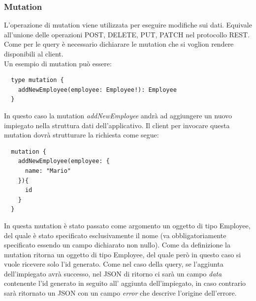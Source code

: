 \subsubsection*{Mutation}
L'operazione di mutation viene utilizzata per eseguire modifiche sui dati. Equivale all'unione delle operazioni POST, DELETE, PUT, PATCH nel protocollo REST. Come per le query è necessario dichiarare le mutation che si voglion rendere disponibili al client.\\
Un esempio di mutation può essere:
\begin{verbatim}
  type mutation {
    addNewEmployee(employee: Employee!): Employee
  }
\end{verbatim}
In questo caso la mutation \textit{addNewEmployee} andrà ad aggiungere un nuovo impiegato nella struttura dati dell'applicativo. Il client per invocare questa mutation dovrà strutturare la richiesta come segue:
\begin{verbatim}
  mutation {
    addNewEmployee(employee: {
      name: "Mario"
    }){
      id
    }
  }
\end{verbatim}
In questa mutation è stato passato come argomento un oggetto di tipo Employee, del quale è stato specificato esclusivamente il nome (va obbligatoriamente specificato essendo un campo dichiarato non nullo). Come da definizione la mutation ritorna un oggetto di tipo Employee, del quale però in questo caso si vuole ricevere solo l'id generato. Come nel caso della query, se l'aggiunta dell'impiegato avrà successo, nel JSON di ritorno ci sarà un campo \textit{data} contenente l'id generato in seguito all' aggiunta dell'impiegato, in caso contrario sarà ritornato un JSON con un campo \textit{error} che descrive l'origine dell'errore.
